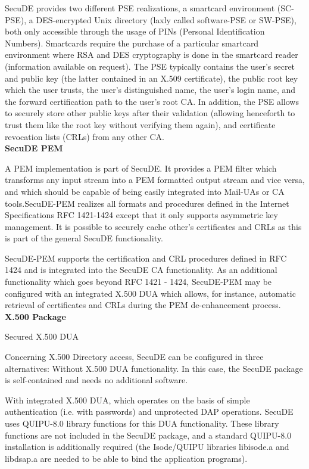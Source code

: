 SecuDE provides two different PSE realizations,
\bi 
\m a smartcard environment (SC-PSE), 
\m a DES-encrypted Unix directory (laxly called software-PSE or SW-PSE),
\ei 
both only accessible through the usage of PINs (Personal Identification Numbers).
Smartcards require the purchase of a particular smartcard environment where 
RSA and DES cryptography is done in the smartcard reader (information available 
on request).
The PSE typically contains the user's secret and public key (the latter
contained in an X.509 certificate), the public root key which the user
trusts, the user's distinguished name, the user's login name, and the 
forward certification path to the user's root CA. In addition, the PSE 
allows to securely store other public keys after their validation 
(allowing henceforth to trust them like the root key without verifying 
them again), and certificate revocation lists (CRLs) from any other CA.
\\ [1em]
{\bf SecuDE PEM}

A PEM implementation is part of SecuDE. It provides a PEM filter
which transforms any input stream into a PEM formatted output stream 
and vice versa, and which should be capable of being  easily 
integrated into Mail-UAs or CA tools.SecuDE-PEM realizes all formats 
and procedures defined in the Internet Specifications RFC 1421-1424 
except that it only supports asymmetric key management. It is
possible to securely cache other's certificates and CRLs as this 
is part of the general SecuDE functionality.

SecuDE-PEM supports the certification and CRL procedures defined in RFC 
1424 and is integrated into the SecuDE CA functionality. As an additional 
functionality which goes beyond RFC 1421 - 1424, SecuDE-PEM may be 
configured with an integrated X.500 DUA which allows, for instance, 
automatic retrieval of certificates and CRLs during the PEM de-enhancement 
process.  
\\ [1em]
{\bf X.500 Package}

Secured X.500 DUA

Concerning X.500 Directory access, SecuDE can be configured in three 
alternatives:
\be
\m Without X.500 DUA functionality. In this case, the SecuDE package
   is self-contained and needs no additional software.

\m With integrated X.500 DUA, which operates on the basis of simple
   authentication (i.e. with passwords) and unprotected DAP operations.
   SecuDE uses QUIPU-8.0 library functions for this DUA functionality.
   These library functions are not included in the SecuDE package, and
   a standard QUIPU-8.0 installation is additionally required (the 
   Isode/QUIPU libraries libisode.a and libdsap.a are needed to be able 
   to bind the application programs).

